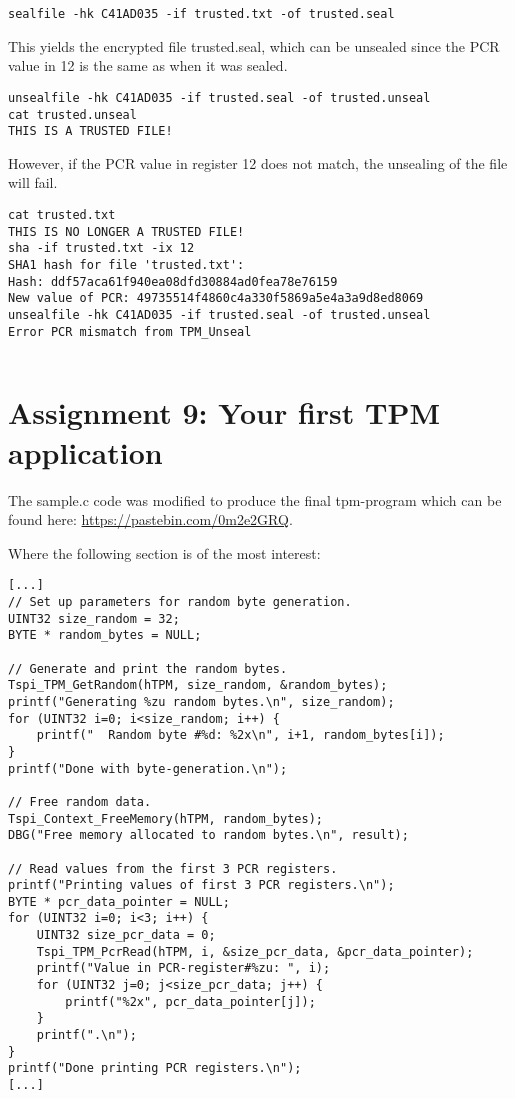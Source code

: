 \documentclass[10pt]{article}
\begin{document}
\begin{verbatim}
sealfile -hk C41AD035 -if trusted.txt -of trusted.seal
\end{verbatim}

    This yields the encrypted file trusted.seal, which can be unsealed since
    the PCR value in 12 is the same as when it was sealed.

\begin{verbatim}
unsealfile -hk C41AD035 -if trusted.seal -of trusted.unseal
cat trusted.unseal
THIS IS A TRUSTED FILE!
\end{verbatim}

    However, if the PCR value in register 12 does not match, the unsealing of
    the file will fail.

\begin{verbatim}
cat trusted.txt
THIS IS NO LONGER A TRUSTED FILE!
sha -if trusted.txt -ix 12
SHA1 hash for file 'trusted.txt':
Hash: ddf57aca61f940ea08dfd30884ad0fea78e76159
New value of PCR: 49735514f4860c4a330f5869a5e4a3a9d8ed8069
unsealfile -hk C41AD035 -if trusted.seal -of trusted.unseal
Error PCR mismatch from TPM_Unseal
\end{verbatim}

\begin{verbatim}
\end{verbatim}

\section{Assignment 9: Your first TPM application}

The sample.c code was modified to produce the final tpm-program which can be
found here: \url{https://pastebin.com/0m2e2GRQ}.

Where the following section is of the most interest:

\begin{lstlisting}
[...]
// Set up parameters for random byte generation.
UINT32 size_random = 32;
BYTE * random_bytes = NULL;

// Generate and print the random bytes.
Tspi_TPM_GetRandom(hTPM, size_random, &random_bytes);
printf("Generating %zu random bytes.\n", size_random);
for (UINT32 i=0; i<size_random; i++) {
    printf("  Random byte #%d: %2x\n", i+1, random_bytes[i]);
}
printf("Done with byte-generation.\n");

// Free random data.
Tspi_Context_FreeMemory(hTPM, random_bytes);
DBG("Free memory allocated to random bytes.\n", result);

// Read values from the first 3 PCR registers.
printf("Printing values of first 3 PCR registers.\n");
BYTE * pcr_data_pointer = NULL;
for (UINT32 i=0; i<3; i++) {
    UINT32 size_pcr_data = 0;
    Tspi_TPM_PcrRead(hTPM, i, &size_pcr_data, &pcr_data_pointer);
    printf("Value in PCR-register#%zu: ", i);
    for (UINT32 j=0; j<size_pcr_data; j++) {
        printf("%2x", pcr_data_pointer[j]);
    }
    printf(".\n");
}
printf("Done printing PCR registers.\n");
[...]
\end{lstlisting}
\end{document}
